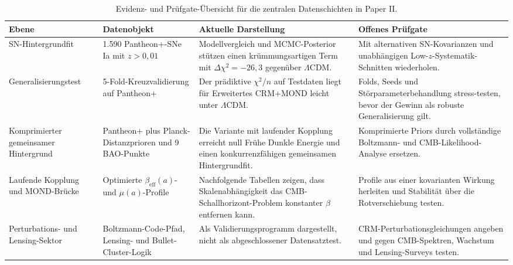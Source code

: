\documentclass[aps,prd,twocolumn,superscriptaddress,nofootinbib,floatfix]{revtex4-2}
\begin{document}
\begin{table}[t]
\centering
\caption{Evidenz- und Prüfgate-Übersicht für die zentralen Datenschichten in Paper II.}
\label{tab:evidence_gate_ledger}
\footnotesize
\begin{tabular}{@{}llll@{}}
\toprule
\parbox[t]{0.17\textwidth}{\raggedright \textbf{Ebene}} & \parbox[t]{0.21\textwidth}{\raggedright \textbf{Datenobjekt}} & \parbox[t]{0.26\textwidth}{\raggedright \textbf{Aktuelle Darstellung}} & \parbox[t]{0.24\textwidth}{\raggedright \textbf{Offenes Prüfgate}} \\
\midrule
\parbox[t]{0.17\textwidth}{\raggedright SN-Hintergrundfit} & \parbox[t]{0.21\textwidth}{\raggedright 1.590 Pantheon+-SNe Ia mit $z>0{,}01$} & \parbox[t]{0.26\textwidth}{\raggedright Modellvergleich und MCMC-Posterior stützen einen krümmungsartigen Term mit $\Delta\chi^2=-26{,}3$ gegenüber $\Lambda$CDM.} & \parbox[t]{0.24\textwidth}{\raggedright Mit alternativen SN-Kovarianzen und unabhängigen Low-$z$-Systematik-Schnitten wiederholen.} \\
\parbox[t]{0.17\textwidth}{\raggedright Generalisierungstest} & \parbox[t]{0.21\textwidth}{\raggedright 5-Fold-Kreuzvalidierung auf Pantheon+} & \parbox[t]{0.26\textwidth}{\raggedright Der prädiktive $\chi^2/n$ auf Testdaten liegt für Erweitertes CRM+MOND leicht unter $\Lambda$CDM.} & \parbox[t]{0.24\textwidth}{\raggedright Folds, Seeds und Störparameterbehandlung stress-testen, bevor der Gewinn als robuste Generalisierung gilt.} \\
\parbox[t]{0.17\textwidth}{\raggedright Komprimierter gemeinsamer Hintergrund} & \parbox[t]{0.21\textwidth}{\raggedright Pantheon+ plus Planck-Distanzprioren und 9 BAO-Punkte} & \parbox[t]{0.26\textwidth}{\raggedright Die Variante mit laufender Kopplung erreicht null Frühe Dunkle Energie und einen konkurrenzfähigen gemeinsamen Hintergrundfit.} & \parbox[t]{0.24\textwidth}{\raggedright Komprimierte Priors durch vollständige Boltzmann- und CMB-Likelihood-Analyse ersetzen.} \\
\parbox[t]{0.17\textwidth}{\raggedright Laufende Kopplung und MOND-Brücke} & \parbox[t]{0.21\textwidth}{\raggedright Optimierte $\beta_{\mathrm{eff}}(a)$- und $\mu(a)$-Profile} & \parbox[t]{0.26\textwidth}{\raggedright Nachfolgende Tabellen zeigen, dass Skalenabhängigkeit das CMB-Schallhorizont-Problem konstanter $\beta$ entfernen kann.} & \parbox[t]{0.24\textwidth}{\raggedright Profile aus einer kovarianten Wirkung herleiten und Stabilität über die Rotverschiebung testen.} \\
\parbox[t]{0.17\textwidth}{\raggedright Perturbations- und Lensing-Sektor} & \parbox[t]{0.21\textwidth}{\raggedright Boltzmann-Code-Pfad, Lensing- und Bullet-Cluster-Logik} & \parbox[t]{0.26\textwidth}{\raggedright Als Validierungsprogramm dargestellt, nicht als abgeschlossener Datensatztest.} & \parbox[t]{0.24\textwidth}{\raggedright CRM-Perturbationsgleichungen angeben und gegen CMB-Spektren, Wachstum und Lensing-Surveys testen.} \\
\bottomrule
\end{tabular}
\end{table}
\end{document}

